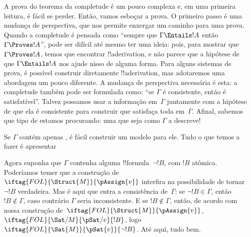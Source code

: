 \documentclass[../../../include/open-logic-section]{subfiles}
\begin{document}
      {}
      {}


A prova do teorema da completude é um pouco complexa e, em uma primeira
leitura, é fácil se perder.  Então, vamos esboçar a prova.  O
primeiro passo é uma mudança de perspectiva, que nos permite enxergar
um caminho para uma prova.  Quando a completude é pensada como
``sempre que $\Gamma \Entails !A$ então $\Gamma \Proves !A$'', pode
ser difícil até mesmo ter uma ideia: pois, para mostrar que $\Gamma
\Proves !A$, temos que encontrar !!a{derivation}, e não parece que a
hipótese de que $\Gamma \Entails !A$ nos ajude nisso de alguma forma.
Para alguns sistemas de prova, é possível construir diretamente
!!a{derivation}, mas adotaremos uma abordagem um pouco diferente.  A
mudança de perspectiva necessária é esta: a completude também pode ser
formulada como: ``se $\Gamma$ é consistente, então é satisfatível''.
Talvez possamos usar a informação em~$\Gamma$ juntamente com a hipótese
de que ela é consistente para construir
 que satisfaça toda
 em~$\Gamma$.  Afinal, sabemos
que tipo de  estamos
procurando: uma que seja como $\Gamma$ a descreve!{}

Se $\Gamma$ contém apenas , é fácil construir
um modelo para ele. Tudo o que temos a fazer é apresentar

Agora suponha que $\Gamma$ contenha alguma !!{formula}~$\lnot !B$, com $!B$
atômica.  Poderíamos temer que a construção de
$\iftag{FOL}{\Struct{M}}{\pAssign{v}}$ interfira na possibilidade
de tornar $\lnot !B$ verdadeira.  Mas é aqui que entra a consistência
de~$\Gamma$: se $\lnot !B \in \Gamma$, então $!B \notin
\Gamma$, caso contrário $\Gamma$ seria inconsistente.  E se $!B \notin
\Gamma$, então, de acordo com nossa construção
de~$\iftag{FOL}{\Struct{M}}{\pAssign{v}}$,
$\iftag{FOL}{\Sat/{M}}{\pSat/{v}}{!B}$, logo
$\iftag{FOL}{\Sat{M}}{\pSat{v}}{\lnot !B}$.  Até aqui, tudo bem.
\end{document}
